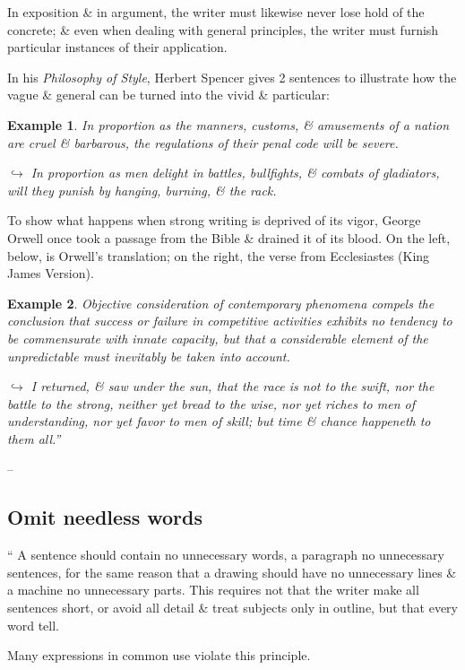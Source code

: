 \documentclass[oneside]{book}
\numberwithin{equation}{section}
\newtheorem{example}{Example}[chapter]
\begin{document}
In exposition \& in argument, the writer must likewise never lose hold of the concrete; \& even when dealing with general principles, the writer must furnish particular instances of their application.

In his \textit{Philosophy of Style}, Herbert Spencer gives 2 sentences to illustrate how the vague \& general can be turned into the vivid \& particular:

\begin{example}
	In proportion as the manners, customs, \& amusements of a nation are cruel \& barbarous, the regulations of their penal code will be severe.
	
	$\hookrightarrow$ In proportion as men delight in battles, bullfights, \& combats of gladiators, will they punish by hanging, burning, \& the rack.
\end{example}
To show what happens when strong writing is deprived of its vigor, George Orwell once took a passage from the Bible \& drained it of its blood. On the left, below, is Orwell's translation; on the right, the verse from Ecclesiastes (King James Version).

\begin{example}
	Objective consideration of contemporary phenomena compels the conclusion that success or failure in competitive activities exhibits no tendency to be commensurate with innate capacity, but that a considerable element of the unpredictable must inevitably be taken into account.
	
	$\hookrightarrow$ I returned, \& saw under the sun, that the race is not to the swift, nor the battle to the strong, neither yet bread to the wise, nor yet riches to men of understanding, nor yet favor to men of skill; but time \& chance happeneth to them all.''
\end{example}
--  \cite[Chap. 2, Sect. 16, pp. 35--36]{Strunk_White2019}

\subsection{Omit needless words}
`` A sentence should contain no unnecessary words, a paragraph no unnecessary sentences, for the same reason that a drawing should have no unnecessary lines \& a machine no unnecessary parts. This requires not that the writer make all sentences short, or avoid all detail \& treat subjects only in outline, but that every word tell.

Many expressions in common use violate this principle.
\end{document}
